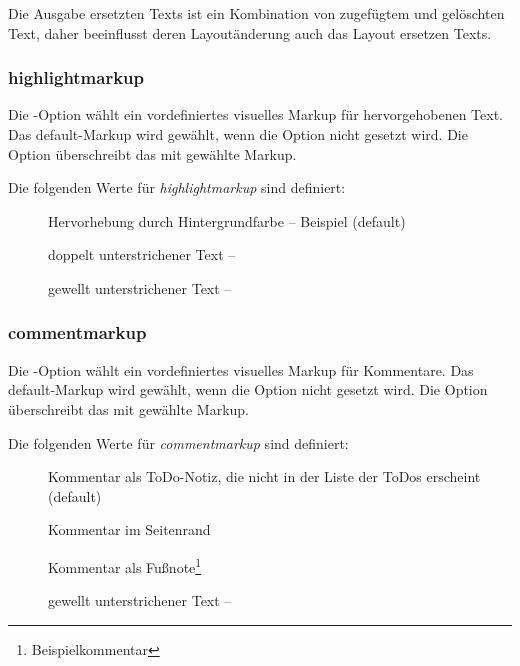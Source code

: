 Die Ausgabe ersetzten Texts ist ein Kombination von zugefügtem und gelöschten Text, daher beeinflusst deren Layoutänderung auch das Layout ersetzen Texts.



\subsubsection{highlightmarkup}


Die -Option wählt ein vordefiniertes visuelles Markup für hervorgehobenen Text.
Das default-Markup wird gewählt, wenn die Option nicht gesetzt wird.
Die Option  überschreibt das mit  gewählte Markup.

Die folgenden Werte für \emph{highlightmarkup} sind definiert:

\begin{description}
	\item [] Hervorhebung durch Hintergrundfarbe -- \colorbox{orange!30}{Beispiel} (default)
	\item [] doppelt unterstrichener Text -- 
	\item [] gewellt unterstrichener Text -- 
\end{description}



\subsubsection{commentmarkup}


Die -Option wählt ein vordefiniertes visuelles Markup für Kommentare.
Das default-Markup wird gewählt, wenn die Option nicht gesetzt wird.
Die Option  überschreibt das mit  gewählte Markup.

Die folgenden Werte für \emph{commentmarkup} sind definiert:

\begin{description}
	\item [] Kommentar als ToDo-Notiz, die nicht in der Liste der ToDos erscheint (default)
	\item [] Kommentar im Seitenrand
	\item [] Kommentar als Fußnote\footnote{Beispielkommentar}
	\item [] gewellt unterstrichener Text -- 
\end{description}

